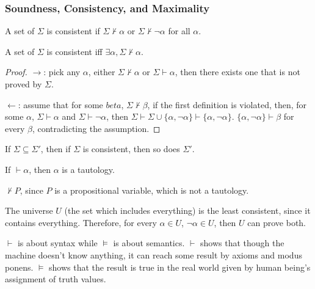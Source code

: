 
\subsubsection{Soundness, Consistency, and Maximality}

\begin{definition}[consistent]
  A set of \wff $\Sigma$ is consistent if $\Sigma\nvdash\alpha$ or $\Sigma\nvdash\neg\alpha$ for all \wff $\alpha$.
\end{definition}

\begin{claim}
  A set of \wff $\Sigma$ is consistent iff $\exists\alpha, \Sigma\nvdash\alpha$.
\end{claim}

\begin{proof}

  $\rightarrow$: pick any $\alpha$, either $\Sigma\nvdash\alpha$ or $\Sigma\vdash\alpha$, then there exists one that is not proved by $\Sigma$.

$\leftarrow$: assume that for some $beta$, $\Sigma\nvdash\beta$, if the first definition is violated, then, for some $\alpha$, $\Sigma\vdash\alpha$ and $\Sigma\vdash\neg\alpha$, then $\Sigma\vdash\Sigma\cup\{\alpha,\neg\alpha\}\vdash\{\alpha,\neg\alpha\}$. $\{\alpha, \neg\alpha\}\vdash\beta$ for every $\beta$, contradicting the assumption.
\end{proof}

\begin{corollary}
If $\Sigma\subseteq\Sigma'$, then if $\Sigma$ is consistent, then so does $\Sigma'$.
\end{corollary}

\begin{definition}[Soundness]
If $\vdash\alpha$, then $\alpha$ is a tautology.
\end{definition}

\begin{corollary}
$\nvdash P$, since $P$ is a propositional variable, which is not a tautology.
\end{corollary}

The universe $U$ (the set which includes everything) is the least consistent, since it contains everything. Therefore, for every $\alpha\in U$, $\neg\alpha\in U$, then $U$ can prove both.

$\vdash$ is about syntax while $\models$ is about semantics. $\vdash$ shows that though the machine doesn't know anything, it can reach some result by axioms and modus ponens. $\models$ shows that the result is true in the real world given by human being's assignment of truth values.

